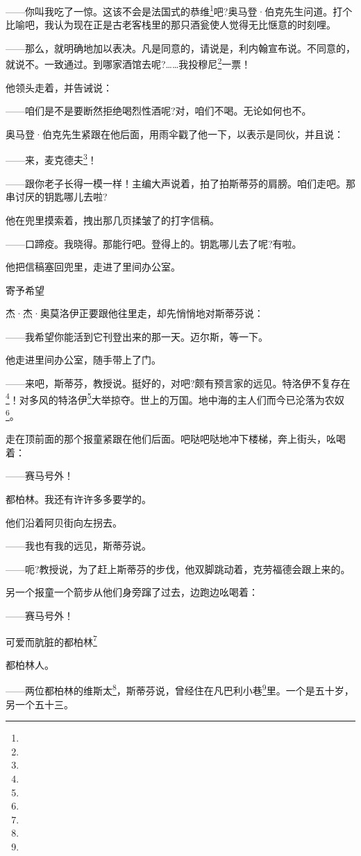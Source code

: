 \par ——你叫我吃了一惊。这该不会是法国式的恭维\footnote{}吧?奥马登·伯克先生问道。打个比喻吧，我认为现在正是古老客栈里的那只酒瓮使人觉得无比惬意的时刻哩。
\par ——那么，就明确地加以表决。凡是同意的，请说是，利内翰宣布说。不同意的，就说不。一致通过。到哪家酒馆去呢?……我投穆尼\footnote{}一票！
\par 他领头走着，并告诫说：
\par ——咱们是不是要断然拒绝喝烈性酒呢?对，咱们不喝。无论如何也不。
\par 奥马登·伯克先生紧跟在他后面，用雨伞戳了他一下，以表示是同伙，并且说：
\par ——来，麦克德夫\footnote{}！
\par ——跟你老子长得一模一样！主编大声说着，拍了拍斯蒂芬的肩膀。咱们走吧。那串讨厌的钥匙哪儿去啦?
\par 他在兜里摸索着，拽出那几页揉皱了的打字信稿。
\par ——口蹄疫。我晓得。那能行吧。登得上的。钥匙哪儿去了呢?有啦。
\par 他把信稿塞回兜里，走进了里间办公室。
\par 寄予希望
\par 杰·杰·奥莫洛伊正要跟他往里走，却先悄悄地对斯蒂芬说：
\par ——我希望你能活到它刊登出来的那一天。迈尔斯，等一下。
\par 他走进里间办公室，随手带上了门。
\par ——来吧，斯蒂芬，教授说。挺好的，对吧?颇有预言家的远见。特洛伊不复存在\footnote{}！对多风的特洛伊\footnote{}大举掠夺。世上的万国。地中海的主人们而今已沦落为农奴\footnote{}。
\par 走在顶前面的那个报童紧跟在他们后面。吧哒吧哒地冲下楼梯，奔上街头，吆喝着：
\par ——赛马号外！
\par 都柏林。我还有许许多多要学的。
\par 他们沿着阿贝街向左拐去。
\par ——我也有我的远见，斯蒂芬说。
\par ——呃?教授说，为了赶上斯蒂芬的步伐，他双脚跳动着，克劳福德会跟上来的。
\par 另一个报童一个箭步从他们身旁蹿了过去，边跑边吆喝着：
\par ——赛马号外！
\par 可爱而肮脏的都柏林\footnote{}
\par 都柏林人。
\par ——两位都柏林的维斯太\footnote{}，斯蒂芬说，曾经住在凡巴利小巷\footnote{}里。一个是五十岁，另一个五十三。
